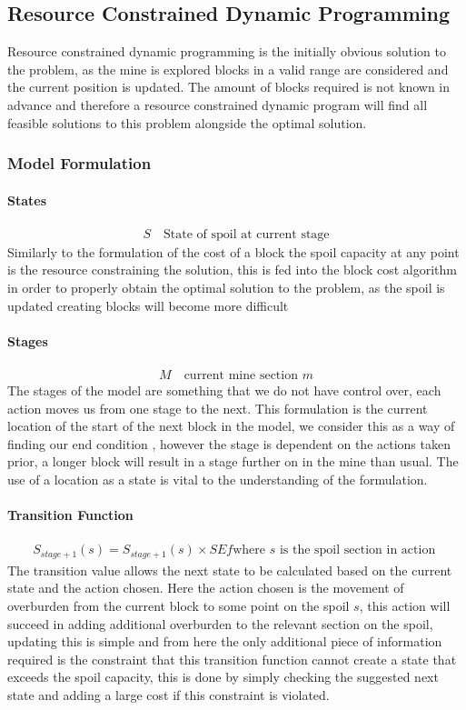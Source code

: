 \subsection{Resource Constrained Dynamic Programming}
Resource constrained dynamic programming is the initially obvious solution to the problem, as the mine is explored blocks in a valid range are considered and the current position is updated. The amount of blocks required is not known in advance and therefore a resource constrained dynamic program will find all feasible solutions to this problem alongside the optimal solution. 
\subsubsection{Model Formulation}
\paragraph*{States}
\begin{align}
\label{Stte}
S \quad \text{State of spoil at current stage}
\end{align}
Similarly to the formulation of the cost of a block the spoil capacity at any point is the resource constraining the solution, this is fed into the block cost algorithm in order to properly obtain the optimal solution to the problem, as the spoil is updated creating blocks will become more difficult 
\paragraph*{Stages}
\begin{align}
\label{DP:Stage0}
M \quad \text{current mine section }m 
\end{align}
The stages of the model are something that we do not have control over, each action moves us from one stage to the next. This formulation is the current location of the start of the next block in the model, we consider this as a way of finding our end condition , however the stage is dependent on the actions taken prior, a longer block will result in a stage further on in the mine than usual. The use of a location as a state is vital to the understanding of the formulation. 
\paragraph*{Transition Function}
\begin{align}
\label{Transition}
S_{stage+1}(s)=S_{stage+1}(s)\times SEf  \text{where $s$ is the spoil section in action }
\end{align}
The transition value allows the next state to be calculated based on the current state and the action chosen. Here the action chosen is the movement of overburden from the current block to some point on the spoil $s$, this action will succeed in adding additional overburden to the relevant section on the spoil, updating this is simple and from here the only additional piece of information required is the constraint that this transition function cannot create a state that exceeds the spoil capacity, this is done by simply checking the suggested next state and adding a large cost if this constraint is violated. 
